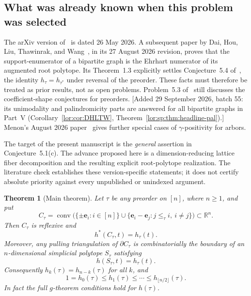 \documentclass[11pt]{article}
\numberwithin{equation}{section}
\newtheorem{theorem}{Theorem}[section]
\theoremstyle{definition}
\newcommand{\R}{\mathbb R}
\newcommand{\conv}{\operatorname{conv}}
\newcommand{\ee}{\mathbf e}
\begin{document}
\subsection{What was already known when this problem was selected}

The arXiv version of~\cite{AC} is dated 26 May 2026. A subsequent paper by
Dai, Hou, Liu, Thawinrak, and Wang~\cite{DHLTW}, in its 27 August 2026 revision,
proves that the support-enumerator of a bipartite graph is the Ehrhart numerator
of its augmented root polytope. Its Theorem~1.3 explicitly settles
Conjecture~5.4 of~\cite{AC}, the identity $h_\tau=h_{\tau^*}$ under reversal of
the preorder. These facts must therefore be treated as prior results, not as
open problems. Problem~5.3 of~\cite{DHLTW} still discusses the coefficient-shape
conjectures for preorders. [Added 29 September 2026, batch 55: its
unimodality and palindromicity parts are answered for all bipartite graphs
in Part~V (Corollary~\ref{lor:cor:DHLTW},
Theorem~\ref{lor:sp:thm:headline-pal}).] Menon's August 2026 paper~\cite{Menon} gives further
special cases of $\gamma$-positivity for arbors.

The target of the present manuscript is the \emph{general} assertion in
Conjecture~5.1(c). The advance proposed here is a dimension-reducing lattice
fiber decomposition and the resulting explicit root-polytope realization. The
literature check establishes these version-specific statements; it does not
certify absolute priority against every unpublished or unindexed argument.

\begin{theorem}[Main theorem]\label{thm:main}
Let $\tau$ be any preorder on $[n]$, where $n\geq1$, and put
\begin{equation}
 C_\tau=\conv\bigl(\{\pm\ee_i:i\in[n]\}
      \cup\{\ee_i-\ee_j:j\leq_\tau i,\ i\ne j\}\bigr)
      \subset\R^n.\label{eq:C}
\end{equation}
Then $C_\tau$ is reflexive and
\begin{equation}
 h^*(C_\tau,t)=h_\tau(t).\label{eq:main}
\end{equation}
Moreover, any pulling triangulation of $\partial C_\tau$ is combinatorially the
boundary of an $n$-dimensional simplicial polytope $S_\tau$ satisfying
\[
 h(S_\tau,t)=h_\tau(t).
\]
Consequently $h_k(\tau)=h_{n-k}(\tau)$ for all $k$, and
\[
 1=h_0(\tau)\leq h_1(\tau)\leq\cdots\leq h_{\lfloor n/2\rfloor}(\tau).
\]
In fact the full $g$-theorem conditions hold for $h(\tau)$.
\end{theorem}
\end{document}
